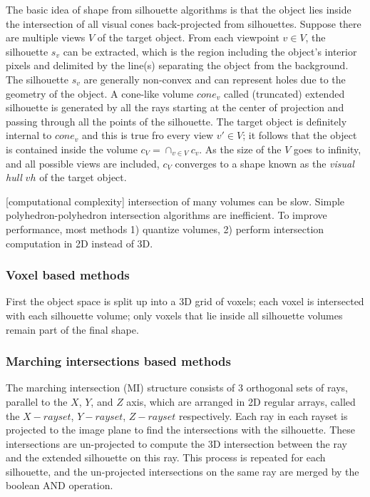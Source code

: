 The basic idea of shape from silhouette algorithms is that the object lies inside the intersection of all visual cones back-projected from silhouettes. Suppose there are multiple views $V$ of the target object. From each viewpoint $v\in V$, the silhouette $s_v$ can be extracted, which is the region including the object's interior pixels and delimited by the line(s) separating the object from the background. The silhouette $s_v$ are generally non-convex and can represent holes due to the geometry of the object. A cone-like volume $cone_v$ called (truncated) extended silhouette is generated by all the rays starting at the center of projection and passing through all the points of the silhouette. The target object is definitely internal to $cone_v$ and this is true fro every view $v'\in V$; it follows that the object is contained inside the volume $c_V=\cap_{v\in V}c_v$. As the size of the $V$ goes to infinity, and all possible views are included, $c_V$ converges to a shape known as the \textit{visual hull} $vh$ of the target object.


[computational complexity] intersection of many volumes can be slow. Simple polyhedron-polyhedron intersection algorithms are inefficient. To improve performance, most methods 1) quantize volumes, 2) perform intersection computation in 2D instead of 3D.

\subsubsection{Voxel based methods}
First the object space is split up into a 3D grid of voxels; each voxel is intersected with each silhouette volume; only voxels that lie inside all silhouette volumes remain part of the final shape.

\subsubsection{Marching intersections based methods}
The marching intersection (MI) structure consists of 3 orthogonal sets of rays, parallel to the $X$, $Y$, and $Z$ axis, which are arranged in 2D regular arrays, called the $X-rayset$, $Y-rayset$, $Z-rayset$ respectively. Each ray in each rayset is projected to the image plane to find the intersections with the silhouette. These intersections are un-projected to compute the 3D intersection between the ray and the extended silhouette on this ray. This process is repeated for each silhouette, and the un-projected intersections on the same ray are merged by the boolean AND operation.

